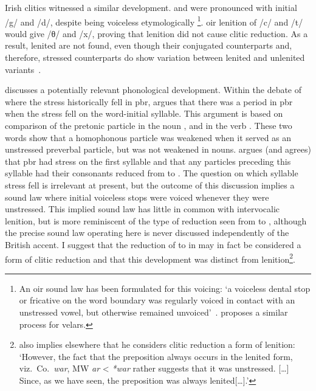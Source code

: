Irish clitics witnessed a similar development.  
 and  were pronounced with initial /g/ and /d/, despite being voiceless etymologically%
\footnote{
  An \gls{oir} sound law has been formulated for this voicing: `a voiceless dental stop or fricative on the word boundary was regularly voiced in contact with an unstressed vowel, but otherwise remained unvoiced'~\autocite[42]{mccone_final_1981}. 
  \Textcite[43]{jongeleen_lenition_2016} proposes a similar process for velars.
}.
\Gls{oir} lenition of /c/ and /t/ would give /θ/ and /x/, proving that lenition did not cause clitic reduction.
As a result, lenited  are not found, even though their conjugated counterparts and, therefore, stressed counterparts do show variation between lenited and unlenited variants~\autocite[43]{jongeleen_lenition_2016}.

\Textcite[16--17]{schrijver_studies_1995} discusses a potentially relevant phonological development.
Within the debate of where the stress historically fell in \gls{pbr},  \textcite{thurneysen_zur_1883} argues that there was a period in \gls{pbr} when the stress fell on the word-initial syllable.
This argument is based on comparison of the pretonic particle  in the noun , and in the verb .
These two words show that a homophonous particle was weakened when it served as an unstressed preverbal particle, but was not weakened in nouns.
\Textcite{thurneysen_zur_1883} argues (and \textcite{schrijver_studies_1995} agrees) that \gls{pbr} had stress on the first syllable and that any particles preceding this syllable had their consonants  reduced from  to .
The question on which syllable stress fell is irrelevant at present, but the outcome of this discussion implies a  sound law where initial voiceless stops were voiced whenever they were unstressed.
This implied sound law has little in common with intervocalic lenition, but is more reminiscent of the type of reduction seen from  to , although the precise sound law operating here is never discussed independently of the British accent.
I suggest that the reduction of  to  in  may in fact be considered a form of clitic reduction and that this development was distinct from lenition\footnote{%
  \Textcite[125]{schrijver_studies_1995} also implies elsewhere that he considers clitic reduction a form of lenition: `However, the fact that the preposition always occurs in the lenited form, viz.\ Co.\ \textit{war}, MW \textit{ar} < \textit{*war} rather suggests that it was unstressed. […] Since, as we have seen, the preposition was always lenited[…].'}.

